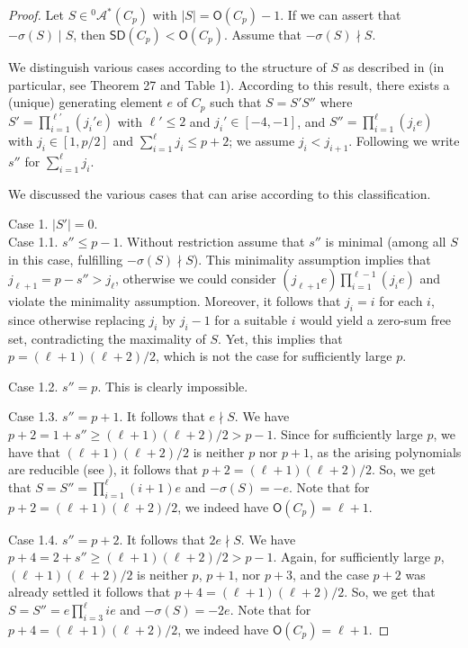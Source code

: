 \documentclass{amsart}
\theoremstyle{definition}
\numberwithin{equation}{section}
\begin{document}
\begin{proof}
Let $S\in {{}^{{0}}\!\mathcal{A}^{\ast}}(C_p)$ with $|S|={\mathsf{O}}(C_p)-1$.
If we can assert that $-\sigma(S)\mid S$, then ${\mathsf{SD}}(C_p)< {\mathsf{O}}(C_p)$.
Assume that $-\sigma(S)\nmid S$.

We distinguish various cases according to the structure of $S$ as described in \cite{Deshouillers}
(in particular, see Theorem 27 and Table 1).
According to this result, there exists a (unique) generating element $e$ of $C_p$ such that
$S=S' S''$ where
$S' = \prod_{i=1}^{\ell'} (j_i' e)$ with $\ell' \le 2$ and $j_i' \in [-4, -1]$, and
$S'' = \prod_{i=1}^{\ell} (j_i e)$ with $j_i \in [1, p/2]$ and  $\sum_{i=1}^{\ell}j_i \le p+2$; we assume $j_i<j_{i+1}$. Following \cite{Deshouillers} we write $s''$ for $\sum_{i=1}^{\ell}j_i$.

We discussed the various cases that can arise according to this classification.

\noindent
Case 1. $|S'|=0$.\\
Case 1.1. $s'' \le p-1$. Without restriction assume that $s''$ is minimal (among all $S$ in this case, fulfilling $-\sigma(S)\nmid S$).
This minimality assumption implies that $j_{\ell +1} = p - s'' > j_{\ell}$, otherwise we could
consider $(j_{\ell+1}e) \prod_{i=1}^{\ell-1} (j_i e)$ and violate the minimality assumption.
Moreover, it follows that $j_{i}=i$ for each $i$, since otherwise
 replacing $j_i$ by $j_i - 1$ for a suitable $i$ would yield a zero-sum free set, contradicting the maximality
of $S$.
Yet, this implies that $p = (\ell+1)(\ell+2)/2$, which is not the case for sufficiently large $p$.

\noindent
Case 1.2.  $s'' = p$. This is clearly impossible.

\noindent
Case 1.3. $s'' = p+1$. It follows that $e \nmid S$.
We have $p+2 = 1 + s'' \ge (\ell+1)(\ell+2)/2 > p-1$.
Since for sufficiently large $p$, we have that $(\ell+1)(\ell+2)/2$ is neither $p$ nor $p+1$, as the arising polynomials are reducible (see \cite{eric}),
it follows that $p+2 = (\ell+1)(\ell+2)/2$.
So, we get that $S=S''=\prod_{i=1}^{\ell} (i+1)e$ and $-\sigma(S)=-e$.
Note that for $p+2= (\ell+1)(\ell+2)/2$, we indeed have ${\mathsf{O}}(C_p)= \ell + 1$.

\noindent
Case 1.4. $s'' = p+2$. It follows that $2e \nmid S$.
We have $p+4 = 2 + s'' \ge (\ell+1)(\ell+2)/2 > p-1$.
Again, for sufficiently large $p$, $(\ell+1)(\ell+2)/2$ is neither $p$, $p+1$, nor $p+3$,  
and the case $p+2$ was already settled 
it follows that $p+4 = (\ell+1)(\ell+2)/2$.
So, we get that $S=S''=e\prod_{i=3}^{\ell} ie$ and $-\sigma(S)=-2e$.
Note that for $p+4= (\ell+1)(\ell+2)/2$, we indeed have ${\mathsf{O}}(C_p)= \ell + 1$.


\end{proof}
\end{document}
